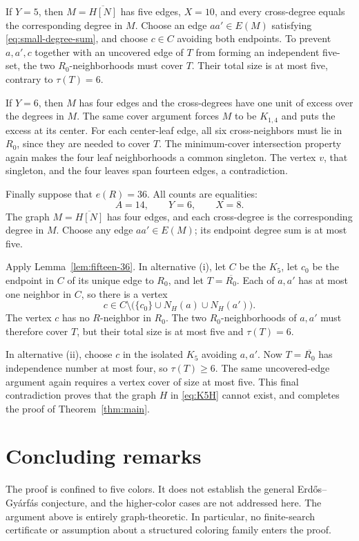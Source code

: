 \documentclass[11pt,reqno,a4paper]{amsart}
\theoremstyle{definition}
\theoremstyle{remark}
\newcommand{\comp}[1]{\overline{#1}}
\begin{document}
If $Y=5$, then $M=\comp{H[N]}$ has five edges, $X=10$, and every
cross-degree equals the corresponding degree in $M$.  Choose an edge
$aa'\in E(M)$ satisfying \eqref{eq:small-degree-sum}, and choose
$c\in C$ avoiding both endpoints.  To prevent $a,a',c$ together with an
uncovered edge of $T$ from forming an independent five-set, the two
$R_0$-neighborhoods must cover $T$.  Their total size is at most five,
contrary to $\tau(T)=6$.

If $Y=6$, then $M$ has four edges and the cross-degrees have one unit of
excess over the degrees in $M$.  The same cover argument forces $M$ to be
$K_{1,4}$ and puts the excess at its center.  For each center-leaf edge, all
six cross-neighbors must lie in $R_0$, since they are needed to cover $T$.
The minimum-cover intersection property again makes the four leaf
neighborhoods a common singleton.  The vertex $v$, that singleton, and the
four leaves span fourteen edges, a contradiction.

Finally suppose that $e(R)=36$.  All counts are equalities:
\[
  A=14,\qquad Y=6,\qquad X=8.
\]
The graph $M=\comp{H[N]}$ has four edges, and each cross-degree is the
corresponding degree in $M$.  Choose any edge $aa'\in E(M)$; its endpoint
degree sum is at most five.

Apply Lemma~\ref{lem:fifteen-36}.  In alternative (i), let $C$ be the
$K_5$, let $c_0$ be the endpoint in $C$ of its unique edge to $R_0$, and
let $T=\comp{R_0}$.  Each of $a,a'$ has at most one neighbor in $C$, so
there is a vertex
\[
  c\in C\setminus\bigl(\{c_0\}\cup N_H(a)\cup N_H(a')\bigr).
\]
The vertex $c$ has no $R$-neighbor in $R_0$.  The two
$R_0$-neighborhoods of $a,a'$ must therefore cover $T$, but their total
size is at most five and $\tau(T)=6$.

In alternative (ii), choose $c$ in the isolated $K_5$ avoiding $a,a'$.
Now $T=\comp{R_0}$ has independence number at most four, so
$\tau(T)\geq6$.  The same uncovered-edge argument again requires a vertex
cover of size at most five.  This final contradiction proves that the graph
$H$ in \eqref{eq:K5H} cannot exist, and completes the proof of
Theorem~\ref{thm:main}.

\section{Concluding remarks}

The proof is confined to five colors.  It does not establish the general
Erd\H{o}s--Gy\'arf\'as conjecture, and the higher-color cases are not addressed
here.  The argument above is entirely graph-theoretic.  In particular, no
finite-search certificate or assumption about a structured coloring family
enters the proof.
\end{document}
